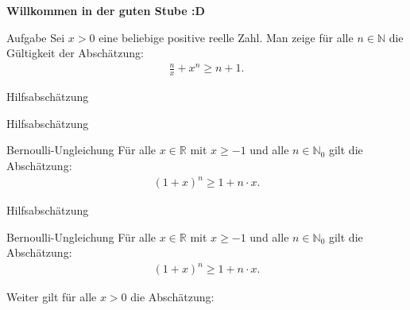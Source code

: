 \documentclass[10pt]{beamer}
\title{}
\author{Artur's \( \oint \) Mathematikstübchen}
\date{}
\def\bN{\mathbb{N}}
\def\bR{\mathbb{R}}
\begin{document}

\begin{frame}
    \begin{center}
        \textbf{\huge Willkommen in der guten Stube \newline \newline :D}
    \end{center}
\end{frame}




\begin{frame}
    \begin{alertblock}{Aufgabe}
        Sei \( x > 0 \) eine beliebige positive reelle Zahl. Man zeige für alle \( n \in \bN \) die Gültigkeit der Abschätzung:
        \begin{align*}
            \frac{n}{x} + x^{n}
            \geq n + 1.
        \end{align*}
    \end{alertblock}
\end{frame}



\begin{frame}{Hilfsabschätzung}
    
\end{frame}



\begin{frame}{Hilfsabschätzung}
    \begin{block}{Bernoulli-Ungleichung}
        Für alle \( x \in \bR \) mit \( x \geq - 1 \) und alle \( n \in \bN_{0} \) gilt die Abschätzung:
        \begin{align*}
            \left( 1 + x \right)^{n}
            \geq 1 + n \cdot x.
        \end{align*}
    \end{block}
\end{frame}



\begin{frame}{Hilfsabschätzung}
    \begin{block}{Bernoulli-Ungleichung}
        Für alle \( x \in \bR \) mit \( x \geq - 1 \) und alle \( n \in \bN_{0} \) gilt die Abschätzung:
        \begin{align*}
            \left( 1 + x \right)^{n}
            \geq 1 + n \cdot x.
        \end{align*}
    \end{block}
    Weiter gilt für alle \( x > 0 \) die Abschätzung:
\end{frame}
\end{document}
